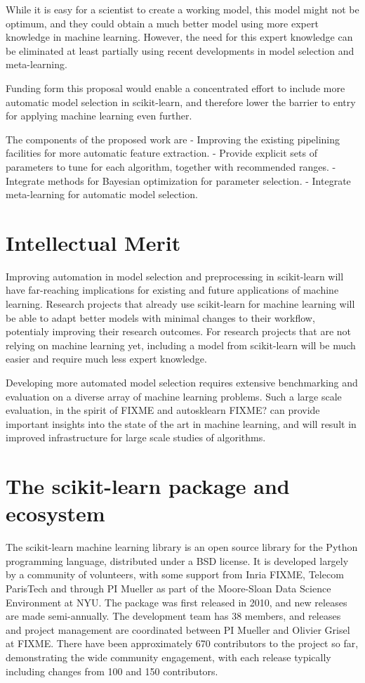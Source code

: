 While it is easy for a scientist to create a working model, this model might not
be optimum, and they could obtain a much better model using more expert knowledge
in machine learning.
However, the need for this expert knowledge can be eliminated at least partially
using recent developments in model selection and meta-learning.

Funding form this proposal would enable a concentrated effort to include more
automatic model selection in scikit-learn, and therefore lower the barrier to
entry for applying machine learning even further.

The components of the proposed work are
- Improving the existing pipelining facilities for more automatic feature extraction.
- Provide explicit sets of parameters to tune for each algorithm, together with recommended ranges.
- Integrate methods for Bayesian optimization for parameter selection.
- Integrate meta-learning for automatic model selection.

\section{Intellectual Merit}
Improving automation in model selection and preprocessing in scikit-learn will have far-reaching
implications for existing and future applications of machine learning.
Research projects that already use scikit-learn for machine learning will be able to adapt better
models with minimal changes to their workflow, potentialy improving their research outcomes.
For research projects that are not relying on machine learning yet, including a model
from scikit-learn will be much easier and require much less expert knowledge.

Developing more automated model selection requires extensive benchmarking and evaluation
on a diverse array of machine learning problems. Such a large scale evaluation,
in the spirit of FIXME and autosklearn FIXME\@? can provide important insights into
the state of the art in machine learning, and will result in improved infrastructure
for large scale studies of algorithms.

\section{The scikit-learn package and ecosystem}
The scikit-learn machine learning library is an open source library for the
Python programming language, distributed under a BSD license.
It is developed largely by a community of volunteers, with some support from
Inria FIXME, Telecom ParisTech and through PI Mueller as part of the
Moore-Sloan Data Science Environment at NYU\@.
The package was first released in 2010, and new releases are made semi-annually.
The development team has 38 members, and releases and project management are
coordinated between PI Mueller and Olivier Grisel at FIXME\@.
There have been approximately 670 contributors to the project so far, demonstrating
the wide community engagement, with each release typically including changes
from 100 and 150 contributors.

